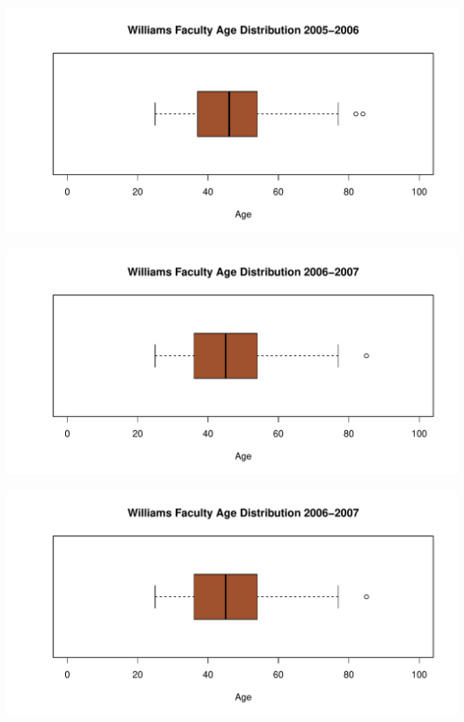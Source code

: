 \documentclass[12pt,a4paper]{article}\usepackage[]{graphicx}\usepackage[]{color}
\makeatletter
\def\maxwidth{ %
  \ifdim\Gin@nat@width>\linewidth
    \linewidth
  \else
    \Gin@nat@width
  \fi
}
\newenvironment{knitrout}{}{} %
\theoremstyle{definition}
\makeatother
\begin{document}
\begin{knitrout}
\color{fgcolor}
\includegraphics[width=\maxwidth]{figure/unnamed-chunk-17-1} 

\end{knitrout}

\begin{knitrout}
\color{fgcolor}
\includegraphics[width=\maxwidth]{figure/unnamed-chunk-18-1} 

\end{knitrout}

\begin{knitrout}
\color{fgcolor}
\includegraphics[width=\maxwidth]{figure/unnamed-chunk-19-1} 

\end{knitrout}
\end{document}
